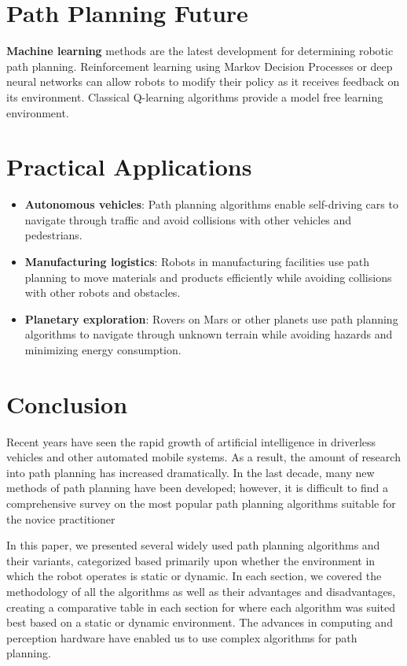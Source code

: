 \documentclass[11pt]{article}
\begin{document}
\section{Path Planning Future}
\textbf{Machine learning} methods are the latest development for determining robotic path planning. Reinforcement learning using Markov Decision Processes or deep neural networks can allow robots to modify their policy as it receives feedback on its environment. Classical Q-learning algorithms provide a model free learning environment.

\section{Practical Applications}
\begin{itemize}
\item\textbf{Autonomous vehicles}: Path planning algorithms enable self-driving cars to navigate through traffic and avoid collisions with other vehicles and pedestrians.
\item\textbf{Manufacturing logistics}: Robots in manufacturing facilities use path planning to move materials and products efficiently while avoiding collisions with other robots and obstacles.
\item\textbf{Planetary exploration}: Rovers on Mars or other planets use path planning algorithms to navigate through unknown terrain while avoiding hazards and minimizing energy consumption.
\end{itemize}

\section{Conclusion}
Recent years have seen the rapid growth of artificial intelligence in driverless vehicles
and other automated mobile systems. As a result, the amount of research into path planning
has increased dramatically. In the last decade, many new methods of path planning have
been developed; however, it is difficult to find a comprehensive survey on the most popular
path planning algorithms suitable for the novice practitioner

In this paper, we presented several widely used path planning algorithms and their
variants, categorized based primarily upon whether the environment in which the robot
operates is static or dynamic. In each section, we covered the methodology of all the
algorithms as well as their advantages and disadvantages, creating a comparative table
in each section for where each algorithm was suited best based on a static or dynamic
environment. The advances in computing and perception hardware have enabled us to use
complex algorithms for path planning.
\end{document}
